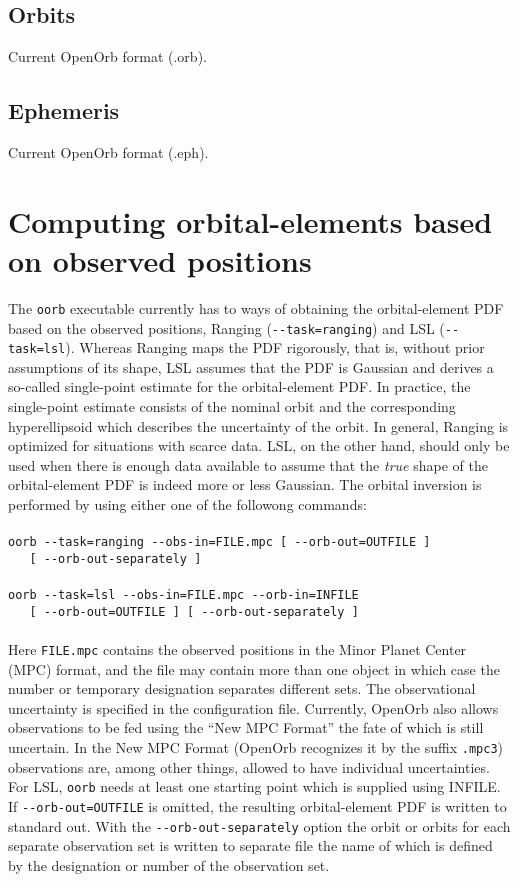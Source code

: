 \documentclass[12pt,english,twoside,a4paper]{report}
\begin{document}
\subsection{Orbits}

Current OpenOrb format (.orb).

\subsection{Ephemeris}

Current OpenOrb format (.eph).



\section{Computing orbital-elements based on observed positions}

The \verb|oorb| executable currently has to ways of obtaining the
orbital-element PDF based on the observed positions, Ranging
(\verb|--task=ranging|) and LSL (\verb|--task=lsl|). Whereas Ranging
maps the PDF rigorously, that is, without prior
assumptions of its shape, LSL assumes that the PDF is Gaussian and
derives a so-called single-point estimate for the orbital-element
PDF. In practice, the single-point estimate consists of the nominal
orbit and the corresponding hyperellipsoid which describes the
uncertainty of the orbit. In general, Ranging is optimized for
situations with scarce data. LSL, on the other hand, should only be
used when there is enough data available to assume that the {\it true}
shape of the orbital-element PDF is indeed more or less
Gaussian. The orbital inversion is performed by using either one of
the followong commands: \\ \\
\verb|oorb --task=ranging --obs-in=FILE.mpc [ --orb-out=OUTFILE ]| \\
\verb|   [ --orb-out-separately ]| \\ \\ 
\verb|oorb --task=lsl --obs-in=FILE.mpc --orb-in=INFILE|\\
\verb|   [ --orb-out=OUTFILE ] [ --orb-out-separately ]| \\ \\ 
Here \verb|FILE.mpc| contains the observed positions in the Minor
Planet Center (MPC) format, and the file may contain more than one
object in which case the number or temporary designation separates
different sets. The observational uncertainty is specified in the
configuration file. Currently, OpenOrb also allows observations to be
fed using the ``New MPC Format'' the fate of which is still
uncertain. In the New MPC Format (OpenOrb recognizes it by the suffix
\verb|.mpc3|) observations are, among other things, allowed to have
individual uncertainties. For LSL, \verb|oorb| needs at least one
starting point which is supplied using INFILE. If
\verb|--orb-out=OUTFILE| is omitted, the resulting orbital-element
PDF is written to standard out. With the
\verb|--orb-out-separately| option the orbit or orbits for each
separate observation set is written to separate file the name of which
is defined by the designation or number of the observation set.
\end{document}
